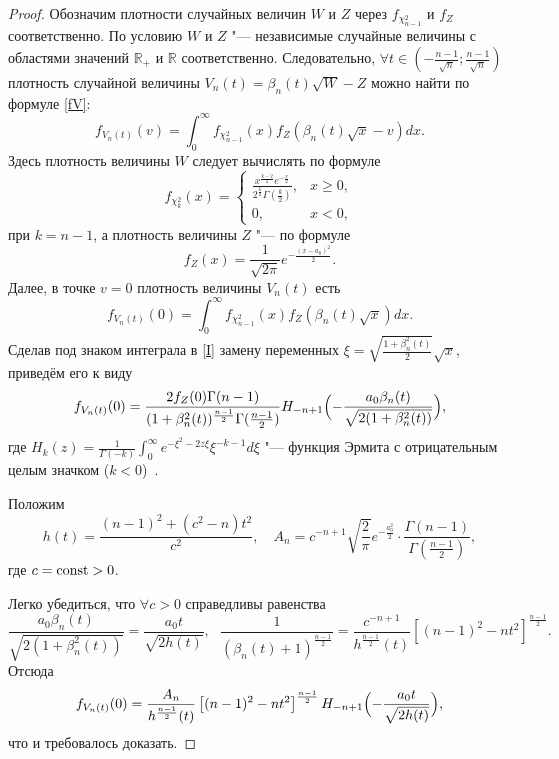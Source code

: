 \begin{proof}%
Обозначим плотности  случайных величин $W$ и $Z$ через $f_{\chi^2_{n-1}}$ и $f_{Z}$ соответственно.
По условию $W$ и $Z$  "---  независимые случайные величины с областями значений $\mathbb{R}_{+}$ и $\mathbb{R}$ соответственно.
Следовательно, $\forall t\in\left(-\frac{n-1}{\sqrt{n}};\frac{n-1}{\sqrt{n}}\right)$ плотность
случайной величины
$V_n(t)=\beta_n(t)\sqrt{W}-Z$ можно найти по формуле \eqref{fV}:
$$
f_{V_n(t)}(v)=\int_0^{\infty}f_{\chi^2_{n-1}}(x)f_{Z}(\beta_n(t)\sqrt{x}-v)dx.
$$ 
Здесь плотность величины $W$ следует вычислять по формуле \cite{Aiv}
\begin{equation}\label{fchi}
f_{\chi^2_{k}}(x)=
\left\{
\begin{array}{cc}
\frac{x^{\frac{k-2}{2}}e^{-\frac{x}{2}}}{2^{\frac{k}{2}}\Gamma\left(\frac{k}{2}\right)},&x\ge0,\\
0,&x<0,
\end{array}
\right.
\end{equation}
при $k=n-1$, а плотность величины $Z$ "--- по формуле
\begin{equation}\label{PLOTNZ}
f_Z(x)=\frac{1}{\sqrt{2\pi}}e^{-\frac{(x-a_0)^2}{2}}.
\end{equation}
Далее, в точке $v=0$ плотность величины $V_n(t)$ есть
\begin{equation}\label{I}
f_{V_n(t)}(0)=\int_0^{\infty}f_{\chi^2_{n-1}}(x)f_{Z}(\beta_n(t)\sqrt{x})dx.
\end{equation}
Сделав  под знаком интеграла в \eqref{I} замену переменных $\xi=\sqrt{\frac{1+\beta_{n}^{2}(t)}{2}}\sqrt{x}$,  приведём его к виду
$$
f_{V_n(t)}(0)=\frac{2f_Z(0)\Gamma(n-1)}{(1+\beta_n^2(t))^{\frac{n-1}{2}}\Gamma(\frac{n-1}{2})}
H_{-n+1}
\Bigl( -\frac{a_0\beta_n(t)}{\sqrt{2(1+\beta_n^2(t))}} \Bigr),
$$
где  $H_{k}(z)=\frac{1}{\Gamma(-k)}{\displaystyle \int_0^{\infty}}e^{-\xi^2-2z\xi}\xi^{-k-1}d\xi$ "---  функция Эрмита с отрицательным целым значком
($k<0$)~\cite{Leb}.

Положим
$$h(t)= \frac{(n-1)^2+(c^2-n)t^2}{c^2},\quad 
A_n=c^{-n+1}\sqrt{\frac{2}{\pi}}e^{-\frac{a_0^2}{2}}\cdot\frac{\Gamma(n-1)}{\Gamma(\frac{n-1}{2})},$$
где $c={\rm const}>0$.

Легко убедиться, что $\forall c>0$ справедливы равенства
$$\frac{a_0\beta_n(t)}{\sqrt{2(1+\beta_n^2(t))}}=\frac{a_0 t}{\sqrt{2h(t)}},\,\,\,\,
\frac{1}{(\beta_n(t)+1)^{\frac{n-1}{2}}}=\frac{c^{-n+1}}{h^{\frac{n-1}{2}}(t)}\left[(n-1)^2-nt^2\right]^{\frac{n-1}{2}}.$$
Отсюда
\begin{eqnarray*}
f_{V_n(t)}(0)=\frac{A_n}{h^{\frac{n-1}{2}}(t)}
\left[(n-1)^2-nt^2\right]^{\frac{n-1}{2}}H_{-n+1}\Bigl(-\frac{a_0 t}{\sqrt{2h(t)}}\Bigr),
\end{eqnarray*}
что и требовалось доказать.\end{proof}

